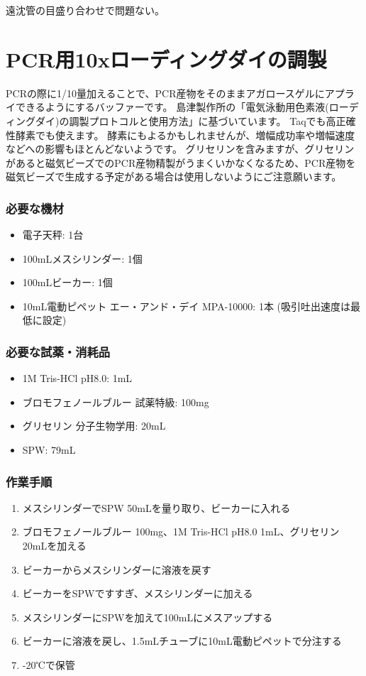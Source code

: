 \documentclass[titlepage,10pt,a4paper,uplatex]{jsbook}
\begin{document}
遠沈管の目盛り合わせで問題ない。

\section{PCR用10xローディングダイの調製}\label{making10xloadingdye}

PCRの際に1/10量加えることで、PCR産物をそのままアガロースゲルにアプライできるようにするバッファーです。
島津製作所の「電気泳動用色素液(ローディングダイ)の調製プロトコルと使用方法」に基づいています。
Taqでも高正確性酵素でも使えます。
酵素にもよるかもしれませんが、増幅成功率や増幅速度などへの影響もほとんどないようです。
グリセリンを含みますが、グリセリンがあると磁気ビーズでのPCR産物精製がうまくいかなくなるため、PCR産物を磁気ビーズで生成する予定がある場合は使用しないようにご注意願います。

\subsubsection{必要な機材}
\begin{itemize}
\item 電子天秤: 1台
\item 100mLメスシリンダー: 1個
\item 100mLビーカー: 1個
\item 10mL電動ピペット エー・アンド・デイ MPA-10000: 1本 (吸引吐出速度は最低に設定)
\end{itemize}

\subsubsection{必要な試薬・消耗品}
\begin{itemize}
\item 1M Tris-HCl pH8.0: 1mL
\item ブロモフェノールブルー 試薬特級: 100mg
\item グリセリン 分子生物学用: 20mL
\item SPW: 79mL
\end{itemize}

\subsubsection{作業手順}
\begin{enumerate}
\item メスシリンダーでSPW 50mLを量り取り、ビーカーに入れる
\item ブロモフェノールブルー 100mg、1M Tris-HCl pH8.0 1mL、グリセリン20mLを加える
\item ビーカーからメスシリンダーに溶液を戻す
\item ビーカーをSPWですすぎ、メスシリンダーに加える
\item メスシリンダーにSPWを加えて100mLにメスアップする
\item ビーカーに溶液を戻し、1.5mLチューブに10mL電動ピペットで分注する
\item -20℃で保管
\end{enumerate}
\end{document}
